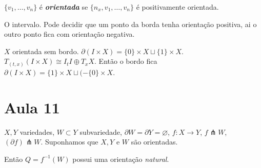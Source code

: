 \begin{defn}\leavevmode
\(\{v_1,\ldots,v_n\}\) é \textit{\textbf{orientada}} se \(\{n_x,v_1,\ldots,v_n\}\) é positivamente orientada.
\end{defn}

\begin{example}\leavevmode
O intervalo. Pode decidir que um ponto da borda tenha orientação positiva, ai o outro ponto fica com orientação negativa.

\(X\) orientada sem bordo. \(\partial  (I\times X)=\{0\}\times X \sqcup \{1\}\times X\). \(T_{(t,x)}(I \times X) \cong I_t I \oplus  T_xX\). Então o bordo fica \(\partial (I \times X)= \{1\}\times X \sqcup (- \{ 0\} \times X\).
\end{example}


\section{Aula 11}

\begin{prop}\leavevmode
\(X,Y\) variedades, \(W \subset Y\) subvariedade, \(\partial W=\partial Y=\varnothing\), \(f: X \to Y\), \(f \pitchfork W\), \((\partial f)\pitchfork W\). Suponhamos que \(X, Y\) e \(W\) são orientadas.

Então  \(Q= f^{-1}(W)\) possui uma orientação \textit{natural}. 
\end{prop}

